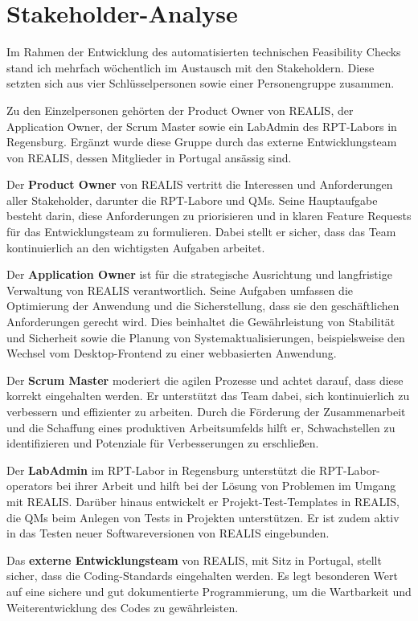 \section{Stakeholder-Analyse}
Im Rahmen der Entwicklung des automatisierten technischen Feasibility Checks stand ich mehrfach wöchentlich im Austausch mit den Stakeholdern. Diese setzten sich aus vier Schlüsselpersonen sowie einer Personengruppe zusammen.

Zu den Einzelpersonen gehörten der Product Owner von \gls{REALIS}, der Application Owner, der Scrum Master sowie ein LabAdmin des \gls{RPT}-Labors in Regensburg. Ergänzt wurde diese Gruppe durch das externe Entwicklungsteam von \gls{REALIS}, dessen Mitglieder in Portugal ansässig sind.

Der \textbf{Product Owner} von \gls{REALIS} vertritt die Interessen und Anforderungen aller Stakeholder, darunter die \gls{RPT}-Labore und \glspl{QM}. Seine Hauptaufgabe besteht darin, diese Anforderungen zu priorisieren und in klaren Feature Requests für das Entwicklungsteam zu formulieren. Dabei stellt er sicher, dass das Team kontinuierlich an den wichtigsten Aufgaben arbeitet.

Der \textbf{Application Owner} ist für die strategische Ausrichtung und langfristige Verwaltung von \gls{REALIS} verantwortlich. Seine Aufgaben umfassen die Optimierung der Anwendung und die Sicherstellung, dass sie den geschäftlichen Anforderungen gerecht wird. Dies beinhaltet die Gewährleistung von Stabilität und Sicherheit sowie die Planung von Systemaktualisierungen, beispielsweise den Wechsel vom Desktop-Frontend zu einer webbasierten Anwendung.

Der \textbf{Scrum Master} moderiert die agilen Prozesse und achtet darauf, dass diese korrekt eingehalten werden. Er unterstützt das Team dabei, sich kontinuierlich zu verbessern und effizienter zu arbeiten. Durch die Förderung der Zusammenarbeit und die Schaffung eines produktiven Arbeitsumfelds hilft er, Schwachstellen zu identifizieren und Potenziale für Verbesserungen zu erschließen.

Der \textbf{LabAdmin} im \gls{RPT}-Labor in Regensburg unterstützt die \gls{RPT}-Labor-\glspl{operator} bei ihrer Arbeit und hilft bei der Lösung von Problemen im Umgang mit \gls{REALIS}. Darüber hinaus entwickelt er Projekt-Test-Templates in \gls{REALIS}, die \glspl{QM} beim Anlegen von Tests in Projekten unterstützen. Er ist zudem aktiv in das Testen neuer Softwareversionen von \gls{REALIS} eingebunden.


Das \textbf{externe Entwicklungsteam} von \gls{REALIS}, mit Sitz in Portugal, stellt sicher, dass die Coding-Standards eingehalten werden. Es legt besonderen Wert auf eine sichere und gut dokumentierte Programmierung, um die Wartbarkeit und Weiterentwicklung des Codes zu gewährleisten.